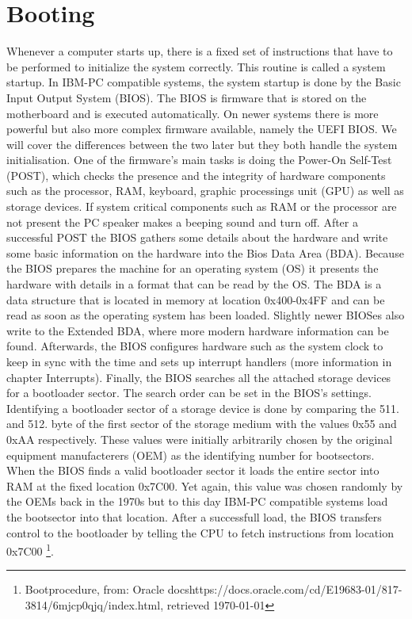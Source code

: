 \section{Booting}

Whenever a computer starts up, there is a fixed set of instructions that
have to be performed to initialize the system correctly. This routine is
called a system startup. In IBM-PC compatible systems, the system startup
is done by the Basic Input Output System (BIOS). The BIOS is firmware
that is stored on the motherboard and is executed automatically. On newer systems there is
more powerful but also more complex firmware available, namely the UEFI BIOS. We
will cover the differences between the two later but they both handle the
system initialisation. One of the firmware's main tasks is doing the Power-On
Self-Test (POST), which checks the presence and the
integrity of hardware components such as the processor, RAM, keyboard,
graphic processings unit (GPU) as well as storage devices. If system critical components such as 
RAM or the processor are not present the PC speaker makes a beeping sound
and turn off. After a successful POST the BIOS gathers some details
about the hardware and write some basic
information on the hardware into the Bios Data Area (BDA). Because the BIOS
prepares the machine for an operating system (OS) it presents the hardware with
details in a format that can be read by the OS.
The BDA is a data structure that is located in memory at location 0x400-0x4FF and
can be read as soon as the operating system has been loaded. Slightly newer BIOSes also
write to the Extended BDA, where more modern hardware information can be
found. Afterwards, the BIOS configures hardware such as the system clock
to keep in sync with the time and sets up interrupt handlers (more information in 
chapter Interrupts). Finally, the BIOS searches all the
attached storage devices for a bootloader sector. The search order can be
set in the BIOS's settings. Identifying a bootloader sector of a storage device is
done by comparing the 511. and 512. byte of the first sector of the storage medium
with the values 0x55 and 0xAA respectively. These values were initially
arbitrarily chosen by the original equipment manufacterers (OEM) as the 
identifying number for bootsectors. When the BIOS finds a valid
bootloader sector it loads the entire sector into RAM at the fixed
location 0x7C00. Yet again, this value was chosen randomly by the OEMs
back in the 1970s but to this day IBM-PC compatible systems load
the bootsector into that location. After a successfull load, the BIOS
transfers control to the bootloader by telling the CPU to fetch
instructions from location 0x7C00
\footnote{Bootprocedure, from: Oracle docshttps://docs.oracle.com/cd/E19683-01/817-3814/6mjcp0qjq/index.html, retrieved \today}.


